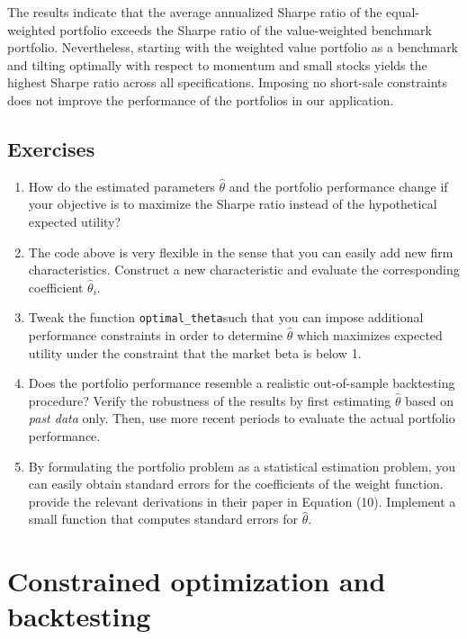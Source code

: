 \documentclass[
]{krantz}
\providecommand{\tightlist}{%
  \setlength{\itemsep}{0pt}\setlength{\parskip}{0pt}}
\begin{document}
The results indicate that the average annualized Sharpe ratio of the equal-weighted portfolio exceeds the Sharpe ratio of the value-weighted benchmark portfolio. Nevertheless, starting with the weighted value portfolio as a benchmark and tilting optimally with respect to momentum and small stocks yields the highest Sharpe ratio across all specifications. Imposing no short-sale constraints does not improve the performance of the portfolios in our application.

\hypertarget{exercises-9}{%
\section{Exercises}\label{exercises-9}}

\begin{enumerate}
\def\labelenumi{\arabic{enumi}.}
\tightlist
\item
  How do the estimated parameters \(\hat\theta\) and the portfolio performance change if your objective is to maximize the Sharpe ratio instead of the hypothetical expected utility?
\item
  The code above is very flexible in the sense that you can easily add new firm characteristics. Construct a new characteristic and evaluate the corresponding coefficient \(\hat\theta_i\).
\item
  Tweak the function \texttt{optimal\_theta}such that you can impose additional performance constraints in order to determine \(\hat\theta\) which maximizes expected utility under the constraint that the market beta is below 1.
\item
  Does the portfolio performance resemble a realistic out-of-sample backtesting procedure? Verify the robustness of the results by first estimating \(\hat\theta\) based on \emph{past data} only. Then, use more recent periods to evaluate the actual portfolio performance.
\item
  By formulating the portfolio problem as a statistical estimation problem, you can easily obtain standard errors for the coefficients of the weight function. \citet{Brandt2009} provide the relevant derivations in their paper in Equation (10). Implement a small function that computes standard errors for \(\hat\theta\).
\end{enumerate}

\hypertarget{constrained-optimization-and-backtesting}{%
\chapter{Constrained optimization and backtesting}\label{constrained-optimization-and-backtesting}}
\end{document}

